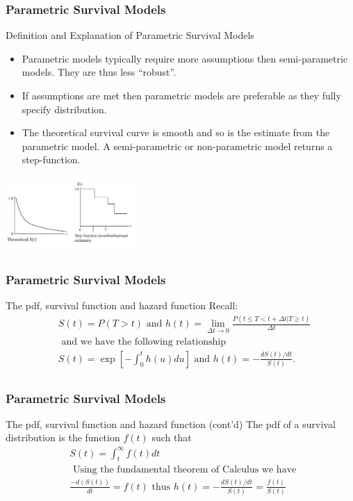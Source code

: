\documentclass{beamer}
\theoremstyle{definition}
\begin{document}
\begin{frame}
\frametitle{Parametric Survival Models}
\begin{block}{Definition and Explanation of Parametric Survival Models}
\begin{itemize}
\item Parametric models typically require more assumptions then semi-parametric models. They are thus less ``robust''.
\item If assumptions are met then parametric models are preferable as they fully specify distribution.
\item The theoretical survival curve is smooth and so is the estimate from the parametric model. A semi-parametric or non-parametric model returns a step-function.
\end{itemize}
\vspace{-5pt}
\begin{center}
        \includegraphics[width=5cm, height=2.9cm]{CH7_pcurves.JPG}
    \end{center}
\end{block}
\end{frame}

\begin{frame}
\frametitle{Parametric Survival Models}
\begin{block}{The pdf, survival function and hazard function}
Recall:
\begin{align*}
& S(t) = P(T>t) \text{ and } h(t) = \lim_{\Delta t \rightarrow 0} \frac{P(t \le T < t + \Delta t | T \ge t)}{\Delta t} \\
& \text{ and we have the following relationship} \\
& S(t) = \exp\left[-\int_0^t h(u) du\right] \text{ and } h(t) = -\frac{d S(t)/dt}{S(t)}. \\
\end{align*}
\end{block}
\end{frame}

\begin{frame}
\frametitle{Parametric Survival Models}
\begin{block}{The pdf, survival function and hazard function (cont'd)}
The pdf of a survival distribution is the function $f(t)$ such that
\begin{align*}
& S(t) = \int_t^\infty f(t) dt \\
& \text{ Using the fundamental theorem of Calculus we have } \\
& \frac{-d(S(t))}{dt} = f(t) \text{ thus } h(t) = -\frac{d S(t)/dt}{S(t)} = \frac{f(t)}{S(t)} \\
\end{align*}
\end{block}
\end{frame}
\end{document}
